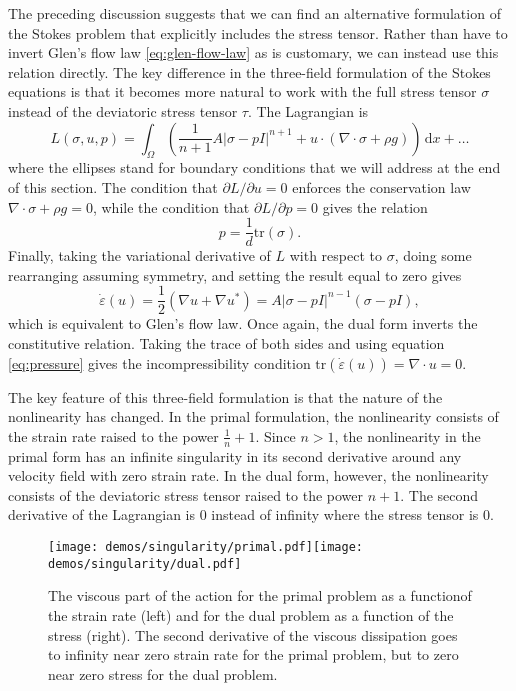 \documentclass{article}
\theoremstyle{definition}
\theoremstyle{plain}
\newcommand{\ud}{\hspace{2pt}\mathrm{d}}
\begin{document}
The preceding discussion suggests that we can find an alternative formulation of the Stokes problem that explicitly includes the stress tensor.
Rather than have to invert Glen's flow law \eqref{eq:glen-flow-law} as is customary, we can instead use this relation directly.
The key difference in the three-field formulation of the Stokes equations is that it becomes more natural to work with the full stress tensor $\sigma$ instead of the deviatoric stress tensor $\tau$.
The Lagrangian is
\begin{equation}
    L(\sigma, u, p) = \int_\Omega\left(\frac{1}{n + 1}A|\sigma - pI|^{n + 1} + u\cdot(\nabla\cdot\sigma + \rho g)\right)\ud x + \ldots
    \label{eq:stokes-dual-action}
\end{equation}
where the ellipses stand for boundary conditions that we will address at the end of this section.
The condition that $\partial L/\partial u = 0$ enforces the conservation law $\nabla\cdot\sigma + \rho g = 0$, while the condition that $\partial L/\partial p = 0$ gives the relation
\begin{equation}
    p = \frac{1}{d}\text{tr}(\sigma).
    \label{eq:pressure}
\end{equation}
Finally, taking the variational derivative of $L$ with respect to $\sigma$, doing some rearranging assuming symmetry, and setting the result equal to zero gives
\begin{equation}
    \dot\varepsilon(u) = \frac{1}{2}(\nabla u + \nabla u^*) = A|\sigma - pI|^{n - 1}(\sigma - pI),
    \label{eq:three-field-constitutive}
\end{equation}
which is equivalent to Glen's flow law.
Once again, the dual form inverts the constitutive relation.
Taking the trace of both sides and using equation \eqref{eq:pressure} gives the incompressibility condition $\text{tr}(\dot\varepsilon(u)) = \nabla\cdot u = 0.$

The key feature of this three-field formulation is that the nature of the nonlinearity has changed.
In the primal formulation, the nonlinearity consists of the strain rate raised to the power $\frac{1}{n} + 1$.
Since $n > 1$, the nonlinearity in the primal form has an infinite singularity in its second derivative around any velocity field with zero strain rate.
In the dual form, however, the nonlinearity consists of the deviatoric stress tensor raised to the power $n + 1$.
The second derivative of the Lagrangian is 0 instead of infinity where the stress tensor is 0.

\begin{figure}[t]
    \texttt{[image: demos/singularity/primal.pdf]}\texttt{[image: demos/singularity/dual.pdf]}
    \caption{The viscous part of the action for the primal problem as a functionof the strain rate (left) and for the dual problem as a function of the stress (right).
    The second derivative of the viscous dissipation goes to infinity near zero strain rate for the primal problem, but to zero near zero stress for the dual problem.}
\end{figure}
\end{document}
